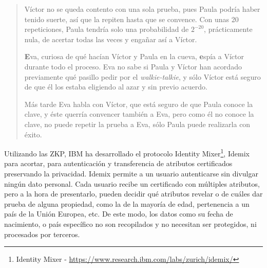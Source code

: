\begin{quote}
	Víctor no se queda contento con una sola prueba, pues Paula podría haber tenido suerte, así que la repiten hasta que se convence. Con unas 20 repeticiones, Paula tendría solo una probabilidad de $2^{-20}$, prácticamente nula, de acertar todas las veces y engañar así a Víctor.
	
	
	\textbf{E}va, curiosa de qué hacían Víctor y Paula en la cueva, \textbf{e}spía a Víctor durante todo el proceso. Eva no sabe si Paula y Víctor han acordado previamente qué pasillo pedir por el \textit{walkie-talkie}, y sólo Víctor está seguro de que él los estaba eligiendo al azar y sin previo acuerdo.%
	
	Más tarde Eva habla con Víctor, que está seguro de que Paula conoce la clave, y éste querría convencer también a Eva, pero como él no conoce la clave, no puede repetir la prueba a Eva, sólo Paula puede realizarla con éxito.
\end{quote}


\hfil

Utilizando las ZKP, IBM ha desarrollado el protocolo Identity Mixer\footnote{Identity Mixer - \url{https://www.research.ibm.com/labs/zurich/idemix/}}, Idemix para acortar, para autenticación y transferencia de atributos certificados preservando la privacidad. Idemix permite a un usuario autenticarse sin divulgar ningún dato personal. Cada usuario recibe un certificado con múltiples atributos, pero a la hora de presentarlo, pueden decidir qué atributos revelar o de cuáles dar prueba de alguna propiedad, como la de la mayoría de edad, pertenencia a un país de la Unión Europea, etc. De este modo, los datos como su fecha de nacimiento, o país específico no son recopilados y no necesitan ser protegidos, ni procesados por terceros.

